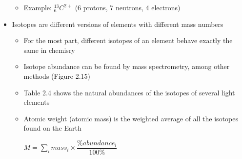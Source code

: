 \documentclass[12pt, openany, letterpaper]{memoir}
\begin{document}
\begin{itemize}
\begin{itemize}
    \item Example: $^{13}_6C^{2+}$ (6 protons, 7 neutrons, 4 electrons)
  \end{itemize}
  \item Isotopes are different versions of elements with different mass numbers
  \begin{itemize}
    \item For the most part, different isotopes of an element behave exactly the same in chemisry
    \item Isotope abundance can be found by mass spectrometry, among other methods (Figure 2.15)
    \item Table 2.4 shows the natural abundances of the isotopes of several light elements
    \item Atomic weight (atomic mass) is the weighted average of all the isotopes found on the Earth

      $M = \sum\limits_{i}mass_i\times\dfrac{\% abundance_i}{100\%}$
  \end{itemize}
\end{itemize}
\end{document}
